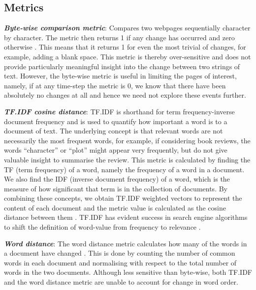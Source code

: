 \documentclass[10pt, a4paper]{article}
\begin{document}
\subsection{Metrics}
\vspace{-2mm}
\textit{\textbf{Byte-wise comparison metric}}:
Compares two webpages sequentially character by character. The metric then returns 1 if any change has occurred and zero otherwise \cite{brewington2000dynamic, cho1999evolution,kim2005empirical}. This means that it returns 1 for even the most trivial of changes, for example, adding a blank space. This metric is thereby over-sensitive and does not provide particularly meaningful insight into the change between two strings of text. However, the byte-wise metric is useful in limiting the pages of interest, namely, if at any time-step the metric is 0, we know that there have been absolutely no changes at all and hence we need not explore these events further.
\vspace{1.5mm}

\noindent \textit{\textbf{TF.IDF cosine distance}}:
TF.IDF is shorthand for term frequency-inverse document frequency and is used to quantify how important a word is to a document of text. The underlying concept is that relevant words are not necessarily the most frequent words, for example, if considering book reviews, the words ``character'' or ``plot'' might appear very frequently, but do not give valuable insight to summarise the review. 
This metric is calculated by finding the TF (term frequency) of a word, namely the frequency of a word in a document. We also find the IDF (inverse document frequency) of a word, which is the measure of how significant that term is in the collection of documents. By combining these concepts, we obtain TF.IDF weighted vectors to represent the content of each document and the metric value is calculated as the cosine distance between them \cite{salton1986introduction}.
TF.IDF has evident success in search engine algorithms to shift the definition of word-value from frequency to relevance \cite{beel2016paper}.

\vspace{1.5mm}
\noindent \textit{\textbf{Word distance}}:
The word distance metric calculates how many of the words in a document have changed \cite{ntoulas2004s}. This is done by counting the number of common words in each document and normalising with respect to the total number of words in the two documents.
Although less sensitive than byte-wise, both TF.IDF and the word distance metric are unable to account for change in word order. 
\end{document}
